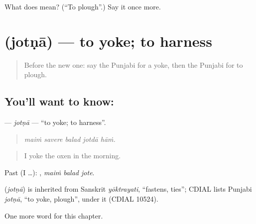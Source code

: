\begin{tcolorbox}[breakable,colback=teal!4,colframe=teal!35!black,title={Before you move on}]
What does  mean? (\textquotedblleft{}To plough\textquotedblright{}.) Say it once more.
\end{tcolorbox}
\section[\texorpdfstring{\pa{ਜੋਤਣਾ} (jotṇā)}{ਜੋਤਣਾ (jotṇā)}]{ (jotṇā) — to yoke; to harness}

\label{lesson:PA-C301-jotna}



\begin{quote}
Before the new one: say the Punjabi for a yoke, then the Punjabi for to plough.
\end{quote}

\subsection*{You'll want to know: }
\textbf{} — \emph{jotṇā} — \textquotedblleft{}to yoke; to harness\textquotedblright{}.

\begin{quote}
    
\end{quote}

\begin{quote}
\emph{maiṁ savere balad jotdā hāṁ.}
\end{quote}

\begin{quote}
I yoke the oxen in the morning.
\end{quote}

Past (I …):   , \emph{maiṁ balad jote}.

\begin{cousinweb}
\textbf{} (\emph{jotṇā}) is inherited from Sanskrit \emph{yōktrayati}, \textquotedblleft{}fastens, ties\textquotedblright{}; CDIAL lists Punjabi \emph{jotṇā}, \textquotedblleft{}to yoke, plough\textquotedblright{}, under it (CDIAL 10524).
\end{cousinweb}

\begin{grammarlens}[title={What you've built}]
One more word for this chapter.
\end{grammarlens}

